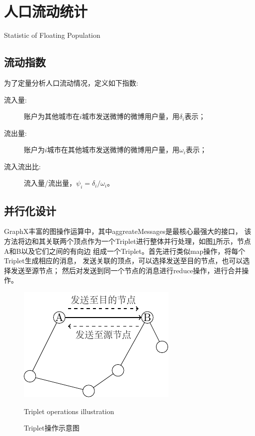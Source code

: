 \section{人口流动统计}{Statistic of Floating Population}
\subsection{流动指数}

为了定量分析人口流动情况，定义如下指数:

\begin{description}
\item[流入量:]账户为其他城市在$i$城市发送微博的微博用户量，用$\delta_i$表示；
\item[流出量:]账户为$i$城市在其他城市发送微博的微博用户量，用$\omega_i$表示；
\item[流入流出比:]流入量/流出量，$\psi_i=\delta_i / \omega_i$。
\end{description}

\subsection{并行化设计}
GraphX丰富的图操作运算中\cite{Gonzalez2014GraphX}，其中aggreateMessages是最核心最强大的接口，
该方法将边和其关联两个顶点作为一个Triplet进行整体并行处理，如图\ref{fig:triplet}所示，节点A和B以及它们之间的有向边
组成一个Triplet。首先进行类似map操作，将每个Triplet生成相应的消息，
发送关联的顶点，可以选择发送至目的节点，也可以选择发送至源节点；
然后对发送到同一个节点的消息进行reduce操作，进行合并操作。
\begin{figure}
  \centering
  \includegraphics[width=0.4 \linewidth]{figures/triplet.pdf}\\
  \caption{Triplet操作示意图}{Triplet operations illustration}
  \label{fig:triplet}
\end{figure}

